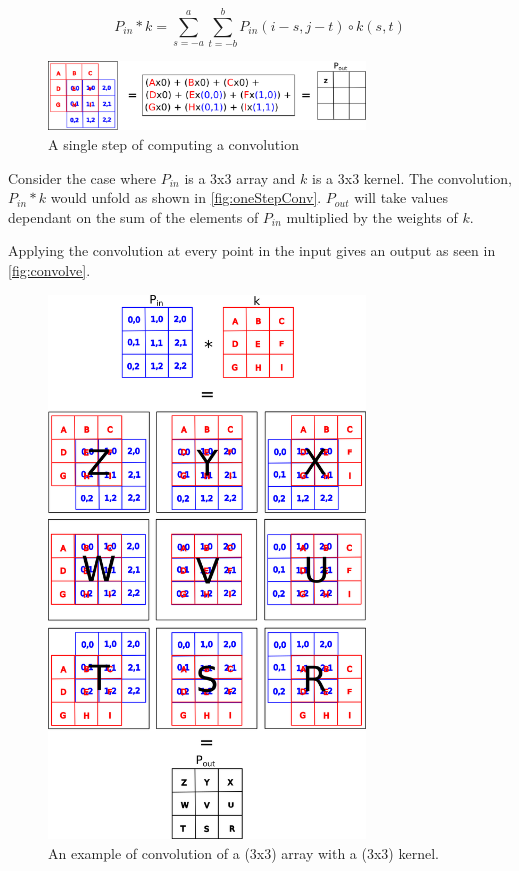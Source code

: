 \begin{equation} \label{eqn:convolution}
P_{in}*k = \sum_{s=-a}^{a}\sum_{t=-b}^{b} P_{in}(i-s, j-t) \circ k(s,t)
\end{equation}

\begin{figure}
	\centering	\includegraphics[width=0.75\textwidth]{Figs/intro2dl/convolutionSingleStep.png}
	\caption{A single step of computing a convolution }
	\label{fig:oneStepConv}
\end{figure}

Consider the case where $P_{in}$ is a 3x3 array and $k$ is a 3x3 kernel. The convolution, $P_{in} * k$ would unfold as shown in \autoref{fig:oneStepConv}. $P_{out}$ will take values dependant on the sum of the elements of $P_{in}$ multiplied by the weights of $k$.

Applying the convolution at every point in the input gives an output as seen in \autoref{fig:convolve}.


\begin{figure}
	\centering	\includegraphics[width=0.75\textwidth]{Figs/intro2dl/convolution.png}
	\caption{An example of convolution of a (3x3) array with a (3x3) kernel.}
	\label{fig:convolve}
\end{figure}


